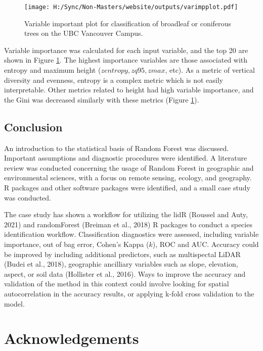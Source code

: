 \documentclass[
]{article}
\begin{document}
\begin{figure}
\centering
\texttt{[image: H:/Sync/Non-Masters/website/outputs/varimpplot.pdf]}
\caption{\label{fig:unnamed-chunk-7}\label{fig:varimpplot} Variable important plot for classification of broadleaf or coniferous trees on the UBC Vancouver Campus.}
\end{figure}

Variable importance was calculated for each input variable, and the top 20 are shown in Figure \ref{fig:varimpplot}. The highest importance variables are those associated with entropy and maximum height (\(zentropy, zq95, zmax\), etc). As a metric of vertical diversity and evenness, entropy is a complex metric which is not easily interpretable. Other metrics related to height had high variable importance, and the Gini was decreased similarly with these metrics (Figure \ref{fig:varimpplot}).

\hypertarget{conclusion}{%
\subsection{Conclusion}\label{conclusion}}

An introduction to the statistical basis of Random Forest was discussed. Important assumptions and diagnostic procedures were identified. A literature review was conducted concerning the usage of Random Forest in geographic and environmental sciences, with a focus on remote sensing, ecology, and geography. R packages and other software packages were identified, and a small case study was conducted.

The case study has shown a workflow for utilizing the lidR (Roussel and Auty, 2021) and randomForest (Breiman et al., 2018) R packages to conduct a species identification workflow. Classification diagnostics were assessed, including variable importance, out of bag error, Cohen's Kappa (\(k\)), ROC and AUC. Accuracy could be improved by including additional predictors, such as multispectal LiDAR (Budei et al., 2018), geographic ancilliary variables such as slope, elevation, aspect, or soil data (Hollister et al., 2016). Ways to improve the accuracy and validation of the method in this context could involve looking for spatial autocorrelation in the accuracy results, or applying k-fold cross validation to the model.

\hypertarget{acknowledgements}{%
\section*{Acknowledgements}\label{acknowledgements}}
\end{document}
